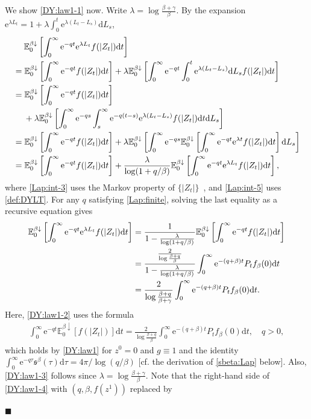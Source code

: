 \documentclass[12pt, twoside]{article}
\numberwithin{figure}{section}
\newcommand{\e}{{\mathrm e}}
\newcommand{\1}{\mathds 1}
\newcommand{\da}{{\downarrow}}
\newcommand{\E}{{\mathbb E}}
\renewcommand{\d}{{\mathrm d}}
\newcommand{\2}{{\mathbf 1}}
\newcommand{\s}{{\mathfrak s}}
\renewenvironment{proof}[1][\proofname]{\noindent {\bfseries #1.}\;}{\hfill\ensuremath{\blacksquare}\\}
\begin{document}
\begin{proof}[Proof of Theorem~\ref{thm:formulas}]
We show \eqref{DY:law1-1} now. Write $\lambda=\log \frac{\beta+\gamma}{\beta}$. By the expansion
$\e^{\lambda L_t}=1+\lambda\int_0^t \e^{\lambda(L_t-L_s)}\d L_s$,
\begin{align}
&\quad\;\E^{\beta\da}_0\left[\int_0^\infty \e^{-qt}\e^{\lambda L_t}f(|Z_t|)\d t\right]\notag\\
&=\E^{\beta\da}_0\left[\int_0^\infty \e^{-qt}f(|Z_t|)\d t\right]+\lambda\E^{\beta\da}_0\left[\int_0^\infty \e^{-qt}\int_0^t \e^{\lambda (L_t-L_s)}\d L_s f(|Z_t|)\d t\right]\notag\\
&= \E^{\beta\da}_0\left[\int_0^\infty \e^{-qt}f(|Z_t|)\d t\right]\notag\\
&\quad\;+\lambda\E^{\beta\da}_0\left[\int_0^\infty \e^{-qs}\int_s^\infty\e^{-q(t-s)}  \e^{\lambda (L_t-L_s)} f(|Z_t|)\d t\d L_s\right]\notag\\
&= \E^{\beta\da}_0\left[\int_0^\infty \e^{-qt}f(|Z_t|)\d t\right]+\lambda\E^{\beta\da}_0\left[\int_0^\infty \e^{-qs}\E^{\beta\da}_0\left[\int_0^\infty\e^{-qt}  \e^{\lambda t} f(|Z_t|)\d t\right]\d L_s\right]\label{Lap:int-3}\\
&=\E^{\beta\da}_0\left[\int_0^\infty \e^{-qt}f(|Z_t|)\d t\right]+\frac{\lambda}{\log (1+q/\beta)}\E^{\beta\da}_0\left[\int_0^\infty \e^{-qt}\e^{\lambda L_t}f(|Z_t|)\d t\right],\label{Lap:int-5}
\end{align}
where \eqref{Lap:int-3} uses the Markov property of $\{|Z_t|\}$~\cite[Theorem~2.1]{DY:Krein}, and \eqref{Lap:int-5} uses \eqref{def:DYLT}. For any $q$ satisfying \eqref{Lap:finite}, solving the last equality as a recursive equation gives 
\begin{align}
\E^{\beta\da}_0\left[\int_0^\infty \e^{-qt}\e^{\lambda L_t}f(|Z_t|)\d t\right]&=\frac{1}{1-\frac{\lambda}{\log (1+q/\beta)}}\E^{\beta\da}_0\left[\int_0^\infty \e^{-qt}f(|Z_t|)\d t\right]\notag\\
&=\frac{\frac{2}{\log \frac{\beta+q}{\beta}}}{1-\frac{\lambda}{\log (1+q/\beta)}}\int_0^\infty \e^{-(q+\beta)t}P_{t}f_\beta(0)\d t\label{DY:law1-2}\\
&=\frac{2}{\log \frac{\beta+q}{\beta+\gamma}}\int_0^\infty \e^{-(q+\beta)t}P_{t}f_\beta(0)\d t.\label{DY:law1-3}
\end{align}
Here, \eqref{DY:law1-2} uses the formula 
\begin{align}\label{DY:law1-4}
\int_0^\infty \e^{-q t}\E^{\beta\da}_0[f(|Z_t|)]\d t=\frac{2}{\log \frac{\beta+q}{\beta}}\int_0^\infty \e^{-(q+\beta)t}P_tf_\beta(0)\d t,\quad q>0,
\end{align}
which holds by \eqref{DY:law1} for $z^0=0$ and $g\equiv 1$ and the identity $\int_0^\infty \e^{-q\tau}\s^\beta(\tau)\d \tau=4\pi /\log (q/\beta)$ [cf. the derivation of \eqref{sbeta:Lap} below]. Also, \eqref{DY:law1-3} follows since $\lambda=\log \frac{\beta+\gamma}{\beta}$. Note that the right-hand side of \eqref{DY:law1-4} with $(q,\beta,f(z^1))$ replaced by 

\end{proof}
\end{document}
